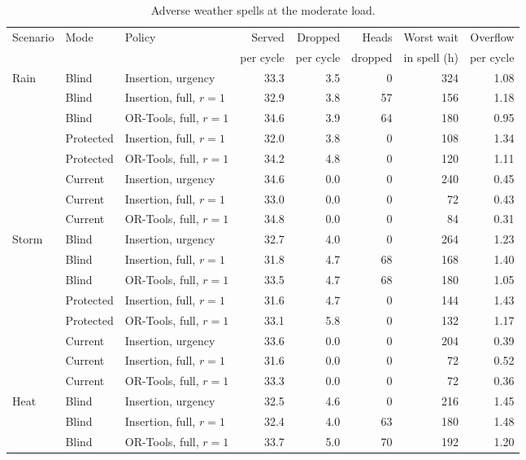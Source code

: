 \begin{table}[!htbp]
\caption{Adverse weather spells at the moderate load.}
\label{tab:weatherresults}
\centering
\small
\setlength{\tabcolsep}{3pt}
\begin{tabular}{lllrrrrr}
\toprule
Scenario & Mode & Policy & Served & Dropped & Heads & Worst wait & Overflow \\
 & & & per cycle & per cycle & dropped & in spell (h) & per cycle \\
\midrule
Rain & Blind & Insertion, urgency & 33.3 & 3.5 & 0 & 324 & 1.08 \\
 & Blind & Insertion, full, $r = 1$ & 32.9 & 3.8 & 57 & 156 & 1.18 \\
 & Blind & OR-Tools, full, $r = 1$ & 34.6 & 3.9 & 64 & 180 & 0.95 \\
 & Protected & Insertion, full, $r = 1$ & 32.0 & 3.8 & 0 & 108 & 1.34 \\
 & Protected & OR-Tools, full, $r = 1$ & 34.2 & 4.8 & 0 & 120 & 1.11 \\
 & Current & Insertion, urgency & 34.6 & 0.0 & 0 & 240 & 0.45 \\
 & Current & Insertion, full, $r = 1$ & 33.0 & 0.0 & 0 & 72 & 0.43 \\
 & Current & OR-Tools, full, $r = 1$ & 34.8 & 0.0 & 0 & 84 & 0.31 \\
\addlinespace
Storm & Blind & Insertion, urgency & 32.7 & 4.0 & 0 & 264 & 1.23 \\
 & Blind & Insertion, full, $r = 1$ & 31.8 & 4.7 & 68 & 168 & 1.40 \\
 & Blind & OR-Tools, full, $r = 1$ & 33.5 & 4.7 & 68 & 180 & 1.05 \\
 & Protected & Insertion, full, $r = 1$ & 31.6 & 4.7 & 0 & 144 & 1.43 \\
 & Protected & OR-Tools, full, $r = 1$ & 33.1 & 5.8 & 0 & 132 & 1.17 \\
 & Current & Insertion, urgency & 33.6 & 0.0 & 0 & 204 & 0.39 \\
 & Current & Insertion, full, $r = 1$ & 31.6 & 0.0 & 0 & 72 & 0.52 \\
 & Current & OR-Tools, full, $r = 1$ & 33.3 & 0.0 & 0 & 72 & 0.36 \\
\addlinespace
Heat & Blind & Insertion, urgency & 32.5 & 4.6 & 0 & 216 & 1.45 \\
 & Blind & Insertion, full, $r = 1$ & 32.4 & 4.0 & 63 & 180 & 1.48 \\
 & Blind & OR-Tools, full, $r = 1$ & 33.7 & 5.0 & 70 & 192 & 1.20 \\

\end{tabular}
\end{table}

